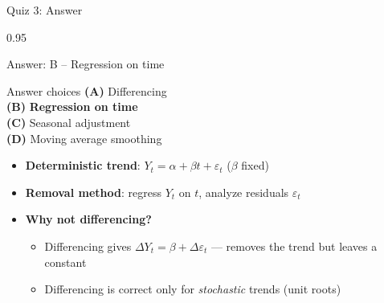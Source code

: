\documentclass[9pt, aspectratio=169, t]{beamer}
\begin{document}
\begin{frame}{Quiz 3: Answer}
    \begin{cminipage}{0.95\textwidth}
    \begin{exampleblock}{Answer: B -- Regression on time}
    {\small
    \begin{block}{Answer choices}
        \textcolor{MainBlue}{\textbf{(A)}} Differencing \incorrect\\[3pt]
        \textcolor{MainBlue}{\textbf{(B)}} \textbf{\textcolor{Forest}{Regression on time}} \correct\\[3pt]
        \textcolor{MainBlue}{\textbf{(C)}} Seasonal adjustment \incorrect\\[3pt]
        \textcolor{MainBlue}{\textbf{(D)}} Moving average smoothing \incorrect
    \end{block}

        \vspace{0.1cm}

        \begin{itemize}
            \item \textbf{Deterministic trend}: $Y_t = \alpha + \beta t + \varepsilon_t$ ($\beta$ fixed)
            \item \textbf{Removal method}: regress $Y_t$ on $t$, analyze residuals $\hat{\varepsilon}_t$
            \item \textbf{Why not differencing?}
                \begin{itemize}
                    \item Differencing gives $\Delta Y_t = \beta + \Delta\varepsilon_t$ --- removes the trend but leaves a constant
                    \item Differencing is correct only for \textit{stochastic} trends (unit roots)
                \end{itemize}
        \end{itemize}
    }
    \end{exampleblock}

    \end{cminipage}
\end{frame}
\end{document}
